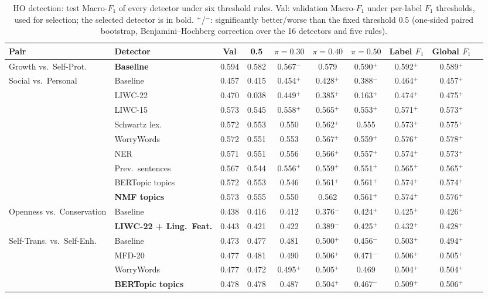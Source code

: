 \begin{table}[!htbp]
\centering
\scriptsize
\caption{HO detection: test Macro-$F_1$ of every detector under six threshold rules. Val: validation Macro-$F_1$ under per-label $F_1$ thresholds, used for selection; the selected detector is in bold. $^{+}$/$^{-}$: significantly better/worse than the fixed threshold 0.5 (one-sided paired bootstrap, Benjamini--Hochberg correction over the 16 detectors and five rules).}
\label{tab:s8-rules-ho}
\begin{tabularx}{\textwidth}{llcccccccc}
\hline
\textbf{Pair} & \textbf{Detector} & \textbf{Val} & \textbf{0.5} & \textbf{$\pi{=}0.30$} & \textbf{$\pi{=}0.40$} & \textbf{$\pi{=}0.50$} & \textbf{Label $F_1$} & \textbf{Global $F_1$} \\
\hline
Growth vs.\ Self-Prot. & \textbf{Baseline} & 0.594 & 0.582 & 0.567$^{-}$ & 0.579 & 0.590$^{+}$ & 0.592$^{+}$ & 0.589$^{+}$ \\
Social vs.\ Personal & Baseline & 0.457 & 0.415 & 0.454$^{+}$ & 0.428$^{+}$ & 0.388$^{-}$ & 0.464$^{+}$ & 0.457$^{+}$ \\
 & LIWC-22 & 0.470 & 0.038 & 0.449$^{+}$ & 0.385$^{+}$ & 0.163$^{+}$ & 0.474$^{+}$ & 0.475$^{+}$ \\
 & LIWC-15 & 0.573 & 0.545 & 0.558$^{+}$ & 0.565$^{+}$ & 0.553$^{+}$ & 0.571$^{+}$ & 0.573$^{+}$ \\
 & Schwartz lex. & 0.572 & 0.553 & 0.550 & 0.562$^{+}$ & 0.555 & 0.573$^{+}$ & 0.575$^{+}$ \\
 & WorryWords & 0.572 & 0.551 & 0.553 & 0.567$^{+}$ & 0.559$^{+}$ & 0.576$^{+}$ & 0.578$^{+}$ \\
 & NER & 0.571 & 0.551 & 0.556 & 0.566$^{+}$ & 0.557$^{+}$ & 0.574$^{+}$ & 0.573$^{+}$ \\
 & Prev.\ sentences & 0.567 & 0.544 & 0.556$^{+}$ & 0.559$^{+}$ & 0.551$^{+}$ & 0.565$^{+}$ & 0.565$^{+}$ \\
 & BERTopic topics & 0.572 & 0.553 & 0.546 & 0.561$^{+}$ & 0.561$^{+}$ & 0.574$^{+}$ & 0.574$^{+}$ \\
 & \textbf{NMF topics} & 0.573 & 0.555 & 0.550 & 0.562 & 0.561$^{+}$ & 0.574$^{+}$ & 0.576$^{+}$ \\
Openness vs.\ Conservation & Baseline & 0.438 & 0.416 & 0.412 & 0.376$^{-}$ & 0.424$^{+}$ & 0.425$^{+}$ & 0.426$^{+}$ \\
 & \textbf{LIWC-22 + Ling.\ Feat.} & 0.443 & 0.421 & 0.422 & 0.389$^{-}$ & 0.425$^{+}$ & 0.432$^{+}$ & 0.428$^{+}$ \\
Self-Trans. vs.\ Self-Enh. & Baseline & 0.473 & 0.477 & 0.481 & 0.500$^{+}$ & 0.456$^{-}$ & 0.503$^{+}$ & 0.494$^{+}$ \\
 & MFD-20 & 0.477 & 0.481 & 0.490 & 0.506$^{+}$ & 0.471$^{-}$ & 0.506$^{+}$ & 0.505$^{+}$ \\
 & WorryWords & 0.477 & 0.472 & 0.495$^{+}$ & 0.505$^{+}$ & 0.469 & 0.504$^{+}$ & 0.504$^{+}$ \\
 & \textbf{BERTopic topics} & 0.478 & 0.478 & 0.487 & 0.504$^{+}$ & 0.467$^{-}$ & 0.509$^{+}$ & 0.506$^{+}$ \\
\hline
\end{tabularx}
\end{table}


